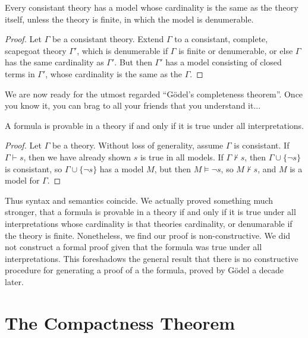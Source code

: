 \begin{theorem}
    Every consistant theory has a model whose cardinality is the same as the theory itself, unless the theory is finite, in which the model is denumerable.
\end{theorem}
\begin{proof}
    Let $\Gamma$ be a consistant theory. Extend $\Gamma$ to a consistant, complete, scapegoat theory $\Gamma'$, which is denumerable if $\Gamma$ is finite or denumerable, or else $\Gamma$ has the same cardinality as $\Gamma'$. But then $\Gamma'$ has a model consisting of closed terms in $\Gamma'$, whose cardinality is the same as the $\Gamma$.
\end{proof}

We are now ready for the utmost regarded ``G\"{o}del's completeness theorem''. Once you know it, you can brag to all your friends that you understand it...

\begin{theorem}
    A formula is provable in a theory if and only if it is true under all interpretations.
\end{theorem}
\begin{proof}
    Let $\Gamma$ be a theory. Without loss of generality, assume $\Gamma$ is consistant. If $\Gamma \vdash s$, then we have already shown $s$ is true in all models. If $\Gamma \not \vdash s$, then $\Gamma \cup \{ \neg s \}$ is consistant, so $\Gamma \cup \{ \neg s \}$ has a model $M$, but then $M \vDash \neg s$, so $M \not \vdash s$, and $M$ is a model for $\Gamma$.
\end{proof}

Thus syntax and semantics coincide. We actually proved something much stronger, that a formula is provable in a theory if and only if it is true under all interpretations whose cardinality is that theories cardinality, or denumarable if the theory is finite. Nonetheless, we find our proof is non-constructive. We did not construct a formal proof given that the formula was true under all interpretations. This foreshadows the general result that there is no constructive procedure for generating a proof of a the formula, proved by G\"{o}del a decade later.

\section{The Compactness Theorem}

